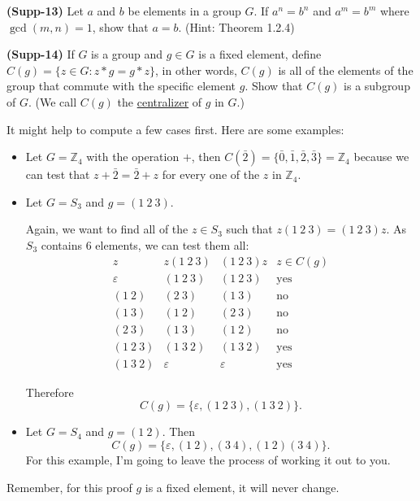 \documentclass[12pt]{article}
\newcommand{\Z}{\mathbb{Z}}
\begin{document}
\newpage
\textbf{(Supp-13)}  Let $a$ and $b$ be elements in a group $G$. If $a^n=b^n$ and $a^m=b^m$ where $\gcd(m,n)=1$, show that $a=b$. (Hint: Theorem 1.2.4)


\newpage
\textbf{(Supp-14)} If $G$ is a group and $g\in G$ is a fixed element, define $C(g)=\{z\in G:z*g=g*z\}$, in other words, $C(g)$ is all of the elements of the group that commute with the specific element $g$.  Show that $C(g)$ is a subgroup of $G$.  (We call $C(g)$ the \underline{centralizer} of $g$ in $G$.)

It might help to compute a few cases first.  Here are some examples:
\begin{itemize}
	\item Let $G=\Z_4$ with the operation $+$, then $C(\bar {2})=\{\bar 0,\bar 1,\bar 2,\bar 3\}=\Z_4$ because we can test that $z+\bar 2 = \bar2+z$ for every one of the $z$ in $\Z_4$.
	\item Let $G= S_3$ and $g=(1\ 2\ 3)$.
	
	Again, we want to find all of the $z\in S_3$ such that $z (1\ 2\ 3) = (1\ 2\ 3)z$.  As $S_3$ contains 6 elements, we can test them all:
	$$\begin{array}{c|c|c|c}
		z&z(1\ 2\ 3)&(1\ 2\ 3)z & z\in C(g)\\\hline
		\varepsilon&(1\ 2\ 3) & (1\ 2\ 3)&\text{yes}\\\hline
		(1\ 2)&(2\ 3) & (1\ 3)&\text{no}\\\hline
		(1\ 3)&(1\ 2) & (2\ 3)&\text{no}\\\hline
		(2\ 3)&(1\ 3) & (1\ 2)&\text{no}\\\hline
		(1\ 2\ 3)&(1\ 3\ 2) & (1\ 3\ 2)&\text{yes}\\\hline
		(1\ 3\ 2)&\varepsilon & \varepsilon&\text{yes}
	\end{array}$$ 
	
	Therefore  
	\[C(g)= \{\varepsilon,(1\ 2\ 3),(1\ 3\ 2)\}.\]
	\item Let $G= S_4$ and $g = (1\ 2)$. Then 
	\[C(g) = \{\varepsilon,(1\ 2),(3\ 4),(1\ 2)(3\ 4)\}.\]
	For this example, I'm going to leave the process of working it out to you. 
\end{itemize}

	Remember, for this proof $g$ is a fixed element, it will never change. 
\end{document}
